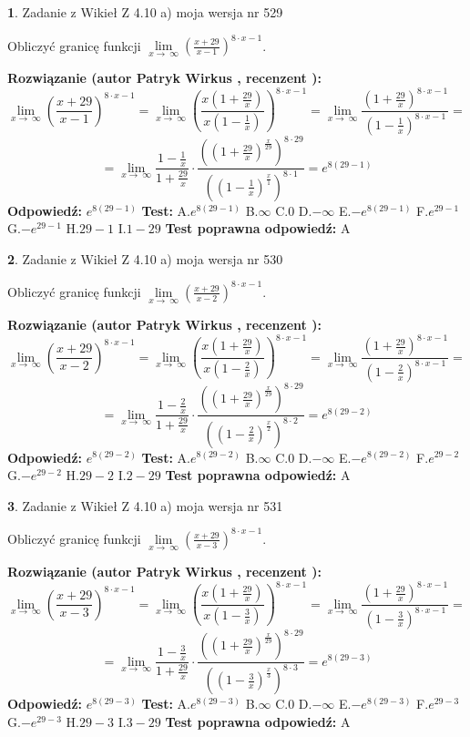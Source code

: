 \documentclass[12pt, a4paper]{article}
\theoremstyle{definition} %
\newtheorem{zad}{}
\newcommand{\zadStart}[1]{\begin{zad}#1\newline}
\newcommand{\zadStop}{\end{zad}}
\newcommand{\rozwStart}[2]{\noindent \textbf{Rozwiązanie (autor #1 , recenzent #2): }\newline}
\newcommand{\rozwStop}{\newline}
\newcommand{\odpStart}{\noindent \textbf{Odpowiedź:}\newline}
\newcommand{\odpStop}{\newline}
\newcommand{\testStart}{\noindent \textbf{Test:}\newline}
\newcommand{\testStop}{\newline}
\newcommand{\kluczStart}{\noindent \textbf{Test poprawna odpowiedź:}\newline}
\newcommand{\kluczStop}{\newline}
\begin{document}
\zadStart{Zadanie z Wikieł Z 4.10 a) moja wersja nr 529}


Obliczyć granicę funkcji  $\lim\limits_{x\to\ \infty}(\frac{x+29}{x-1})^{8\cdot x-1}$.
\zadStop
\rozwStart{Patryk Wirkus}{}
$$\lim\limits_{x\to\ \infty}(\frac{x+29}{x-1})^{8\cdot x-1} = \lim\limits_{x\to\ \infty}(\frac{x(1+\frac{29}{x})}{x(1-\frac{1}{x})})^{8\cdot x-1}=\lim\limits_{x\to\ \infty}\frac{(1+\frac{29}{x})^{8\cdot x-1}}{(1-\frac{1}{x})^{8\cdot x-1}}=$$
$$=\lim\limits_{x\to\ \infty}\frac{1-\frac{1}{x}}{1+\frac{29}{x}}\cdot\frac{((1+\frac{29}{x})^{\frac{x}{29}})^{8\cdot29}}{((1-\frac{1}{x})^{\frac{x}{1}})^{8\cdot1}}=e^{8(29-1)}$$
\rozwStop
\odpStart
$e^{8(29-1)}$
\odpStop
\testStart
A.$e^{8(29-1)}$ B.$\infty$ C.$0$ D.$-\infty$ E.$-e^{8(29-1)}$
F.$e^{29-1}$ G.$-e^{29-1}$
H.$29-1$
I.$1-29$
\testStop
\kluczStart
A
\kluczStop



\zadStart{Zadanie z Wikieł Z 4.10 a) moja wersja nr 530}


Obliczyć granicę funkcji  $\lim\limits_{x\to\ \infty}(\frac{x+29}{x-2})^{8\cdot x-1}$.
\zadStop
\rozwStart{Patryk Wirkus}{}
$$\lim\limits_{x\to\ \infty}(\frac{x+29}{x-2})^{8\cdot x-1} = \lim\limits_{x\to\ \infty}(\frac{x(1+\frac{29}{x})}{x(1-\frac{2}{x})})^{8\cdot x-1}=\lim\limits_{x\to\ \infty}\frac{(1+\frac{29}{x})^{8\cdot x-1}}{(1-\frac{2}{x})^{8\cdot x-1}}=$$
$$=\lim\limits_{x\to\ \infty}\frac{1-\frac{2}{x}}{1+\frac{29}{x}}\cdot\frac{((1+\frac{29}{x})^{\frac{x}{29}})^{8\cdot29}}{((1-\frac{2}{x})^{\frac{x}{2}})^{8\cdot2}}=e^{8(29-2)}$$
\rozwStop
\odpStart
$e^{8(29-2)}$
\odpStop
\testStart
A.$e^{8(29-2)}$ B.$\infty$ C.$0$ D.$-\infty$ E.$-e^{8(29-2)}$
F.$e^{29-2}$ G.$-e^{29-2}$
H.$29-2$
I.$2-29$
\testStop
\kluczStart
A
\kluczStop



\zadStart{Zadanie z Wikieł Z 4.10 a) moja wersja nr 531}


Obliczyć granicę funkcji  $\lim\limits_{x\to\ \infty}(\frac{x+29}{x-3})^{8\cdot x-1}$.
\zadStop
\rozwStart{Patryk Wirkus}{}
$$\lim\limits_{x\to\ \infty}(\frac{x+29}{x-3})^{8\cdot x-1} = \lim\limits_{x\to\ \infty}(\frac{x(1+\frac{29}{x})}{x(1-\frac{3}{x})})^{8\cdot x-1}=\lim\limits_{x\to\ \infty}\frac{(1+\frac{29}{x})^{8\cdot x-1}}{(1-\frac{3}{x})^{8\cdot x-1}}=$$
$$=\lim\limits_{x\to\ \infty}\frac{1-\frac{3}{x}}{1+\frac{29}{x}}\cdot\frac{((1+\frac{29}{x})^{\frac{x}{29}})^{8\cdot29}}{((1-\frac{3}{x})^{\frac{x}{3}})^{8\cdot3}}=e^{8(29-3)}$$
\rozwStop
\odpStart
$e^{8(29-3)}$
\odpStop
\testStart
A.$e^{8(29-3)}$ B.$\infty$ C.$0$ D.$-\infty$ E.$-e^{8(29-3)}$
F.$e^{29-3}$ G.$-e^{29-3}$
H.$29-3$
I.$3-29$
\testStop
\kluczStart
A
\kluczStop
\end{document}
